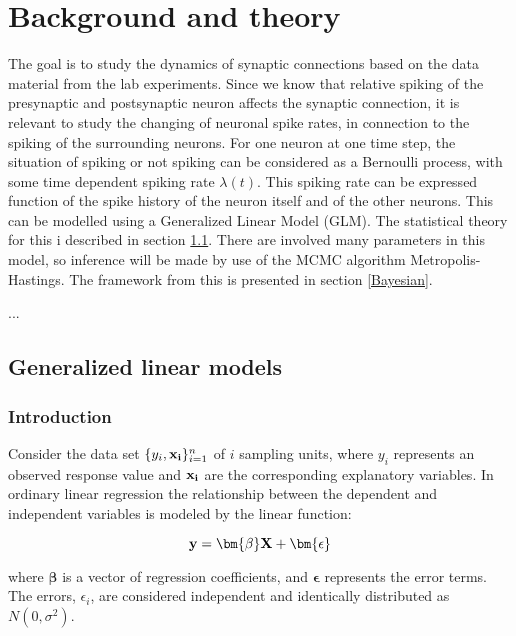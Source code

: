 
\chapter{Background and theory}

The goal is to study the dynamics of synaptic connections based on the data material from the lab experiments. Since we know that relative spiking of the presynaptic and postsynaptic neuron affects the synaptic connection, it is relevant to study the changing of neuronal spike rates, in connection to the spiking of the surrounding neurons. For one neuron at one time step, the situation of spiking or not spiking can be considered as a Bernoulli process, with some time dependent spiking rate $\lambda (t)$. This spiking rate can be expressed function of the spike history of the neuron itself and of the other neurons. This can be modelled using a Generalized Linear Model (GLM). The statistical theory for this i described in section \ref{sec:stats}. There are involved many parameters in this model, so inference will be made by use of the MCMC algorithm Metropolis-Hastings. The framework from this is presented in section \ref{Bayesian}. 

...

\section{Generalized linear models}
\label{sec:stats}

\subsection{Introduction}
\label{Intro_GLM}
Consider the data set $ \{y_{i}, \bold{x_{i}}\}_{i=1}^{n} $ of $i$ sampling units, where $y_i$ represents an observed response value and $ \bold{x_i}$ are the corresponding explanatory variables. In ordinary linear regression the relationship between the dependent and independent variables is modeled by the linear function:

\begin{equation}
    \textbf{y} = \bm{\beta}\bf X + \bm{ \epsilon}
\end{equation}

where $\bm{\beta}$ is a vector of regression coefficients, and $\bm{ \epsilon}$ represents the error terms. The errors, $\epsilon_{i}$, are considered independent and identically distributed as $N(0, \sigma^{2})$.

